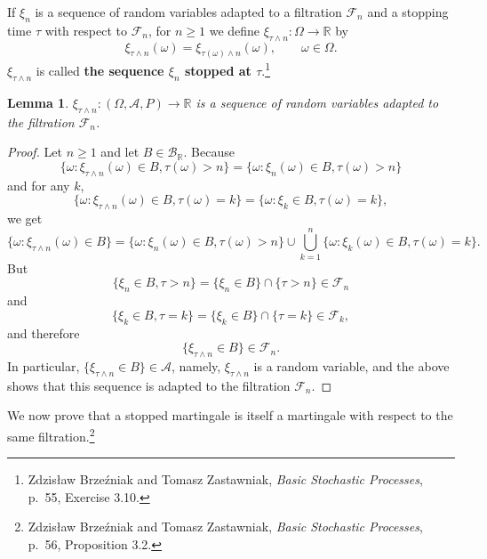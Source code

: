 \documentclass{article}
\newtheorem{lemma}[theorem]{Lemma}
\theoremstyle{definition}
\begin{document}
If $\xi_n$ is a sequence of random variables adapted to a filtration $\mathscr{F}_n$ and a stopping time $\tau$ with respect to $\mathscr{F}_n$,
for $n \geq 1$ we define $\xi_{\tau \wedge n}:\Omega \to \mathbb{R}$ by
\[
\xi_{\tau \wedge n}(\omega) = \xi_{\tau(\omega) \wedge n}(\omega), \qquad \omega \in \Omega.
\]
$\xi_{\tau \wedge n}$ is called \textbf{the sequence $\xi_n$ stopped at $\tau$}.\footnote{Zdzis\l{}aw Brze\'zniak and Tomasz Zastawniak, {\em Basic Stochastic Processes},
p.~55, Exercise 3.10.}

\begin{lemma}
$\xi_{\tau \wedge n}:(\Omega,\mathscr{A},P) \to \mathbb{R}$ is a sequence of random variables adapted to the filtration
$\mathscr{F}_n$.
\end{lemma}
\begin{proof}
Let $n \geq 1$ and let $B \in \mathscr{B}_{\mathbb{R}}$. 
Because
\[
\{\omega: \xi_{\tau \wedge n}(\omega) \in B, \tau(\omega)>n\} = \{\omega: \xi_n(\omega) \in B, \tau(\omega)>n\}
\]
and
 for any $k$,
\[
\{\omega: \xi_{\tau \wedge n}(\omega) \in B, \tau(\omega)=k\} = \{\omega: \xi_k \in B, \tau(\omega) = k\},
\]
we get
\[
\{\omega: \xi_{\tau \wedge n}(\omega) \in B\} = \{\omega: \xi_n(\omega) \in B, \tau(\omega)>n\} \cup \bigcup_{k=1}^n \{\omega: \xi_k(\omega) \in B, \tau(\omega) = k\}.
\]
But 
\[
\{\xi_n \in B, \tau >n\} = \{\xi_n \in B\} \cap \{\tau > n\}
\in \mathscr{F}_n
\]
and
\[
\{\xi_k \in B, \tau=k\} = \{\xi_k \in B\} \cap \{\tau=k\} \in \mathscr{F}_k,
\]
and therefore
\[
\{\xi_{\tau \wedge n} \in B\} \in \mathscr{F}_n.
\]
In particular, $\{\xi_{\tau \wedge n} \in B\} \in \mathscr{A}$, namely, $\xi_{\tau \wedge n}$ is a random variable, and the above
shows that this sequence is adapted to the filtration $\mathscr{F}_n$.
\end{proof}

We now prove that a stopped martingale is itself a martingale with respect to the same filtration.\footnote{Zdzis\l{}aw Brze\'zniak and Tomasz Zastawniak, {\em Basic Stochastic Processes},
p.~56, Proposition 3.2.}
\end{document}

